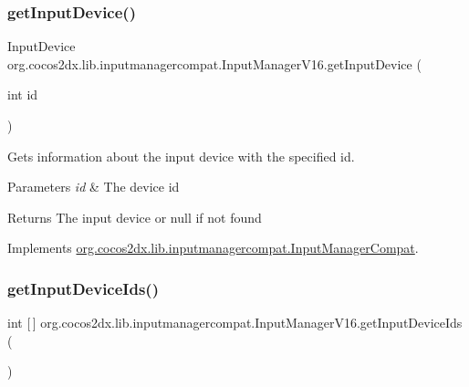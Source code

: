 \subsubsection{\texorpdfstring{get\+Input\+Device()}{getInputDevice()}\hspace{0.1cm}{\footnotesize\ttfamily [2/2]}}
{\footnotesize\ttfamily Input\+Device org.\+cocos2dx.\+lib.\+inputmanagercompat.\+Input\+Manager\+V16.\+get\+Input\+Device (\begin{DoxyParamCaption}\item[{int}]{id }\end{DoxyParamCaption})\hspace{0.3cm}{\ttfamily [inline]}}

Gets information about the input device with the specified id.


\begin{DoxyParams}{Parameters}
{\em id} & The device id \\
\hline
\end{DoxyParams}
\begin{DoxyReturn}{Returns}
The input device or null if not found 
\end{DoxyReturn}


Implements \hyperlink{interfaceorg_1_1cocos2dx_1_1lib_1_1inputmanagercompat_1_1InputManagerCompat_afbfb5229b12433c81ddbf9e0315cd986}{org.\+cocos2dx.\+lib.\+inputmanagercompat.\+Input\+Manager\+Compat}.

\mbox{\label{classorg_1_1cocos2dx_1_1lib_1_1inputmanagercompat_1_1InputManagerV16_a41ff1ae73d68436be41859a4ac5f2e62}} 
\subsubsection{\texorpdfstring{get\+Input\+Device\+Ids()}{getInputDeviceIds()}\hspace{0.1cm}{\footnotesize\ttfamily [1/2]}}
{\footnotesize\ttfamily int \mbox{[}$\,$\mbox{]} org.\+cocos2dx.\+lib.\+inputmanagercompat.\+Input\+Manager\+V16.\+get\+Input\+Device\+Ids (\begin{DoxyParamCaption}{ }\end{DoxyParamCaption})\hspace{0.3cm}{\ttfamily [inline]}}

